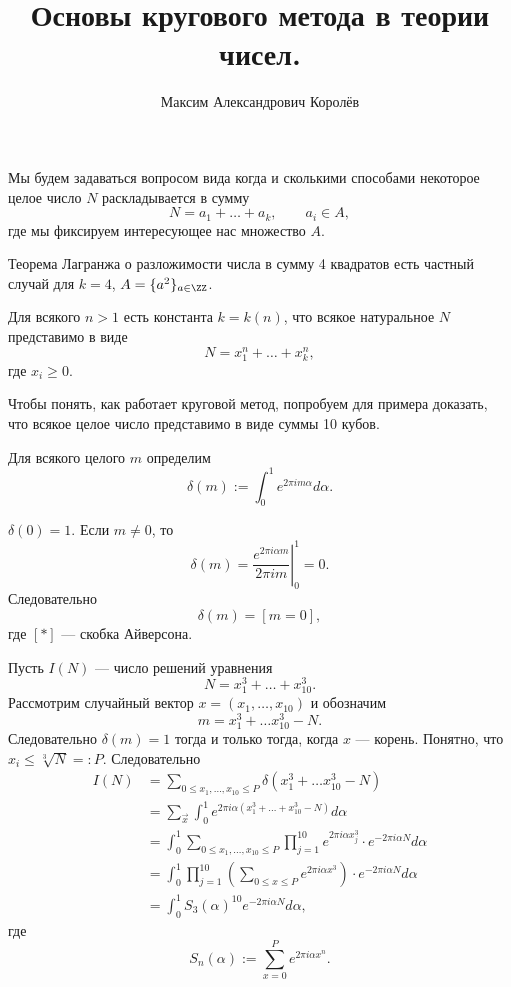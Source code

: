 \documentclass[12pt,a4paper]{article}
\title{Основы кругового метода в теории чисел.}
\author{Максим Александрович Королёв}
\begin{document}
    \maketitle

    Мы будем задаваться вопросом вида когда и сколькими способами некоторое целое число $N$ раскладывается в сумму
    \[N = a_1 + \dots + a_k, \qquad a_i \in A,\]
    где мы фиксируем интересующее нас множество $A$.

    \begin{example}
        Теорема Лагранжа о разложимости числа в сумму 4 квадратов есть частный случай для $k = 4$, $A = \{a^2\}_{a \in \ZZ}$.
    \end{example}

    \begin{statement}
        Для всякого $n > 1$ есть константа $k = k(n)$, что всякое натуральное $N$ представимо в виде
        \[N = x_1^n + \dots + x_k^n,\]
        где $x_i \geqslant 0$.
    \end{statement}

    Чтобы понять, как работает круговой метод, попробуем для примера доказать, что всякое целое число представимо в виде суммы 10 кубов.

    \begin{definition}
        Для всякого целого $m$ определим
        \[\delta(m) := \int_0^1 e^{2\pi i m \alpha} d\alpha.\]
    \end{definition}

    \begin{remark}
        $\delta(0) = 1$. Если $m \neq 0$, то
        \[\delta(m) = \left.\frac{e^{2\pi i \alpha m}}{2 \pi i m}\right|_0^1 = 0.\]
        Следовательно
        \[\delta(m) = [m = 0],\]
        где $[*]$ --- скобка Айверсона.
    \end{remark}

    Пусть $I(N)$ --- число решений уравнения
    \[N = x_1^3 + \dots + x_{10}^3.\]
    Рассмотрим случайный вектор $x = (x_1, \dots, x_{10})$ и обозначим
    \[m = x_1^3 + \dots x_{10}^3 - N.\]
    Следовательно $\delta(m) = 1$ тогда и только тогда, когда $x$ --- корень. Понятно, что $x_i \leqslant \sqrt[3]{N} =: P$. Следовательно
    \begin{align*}
        I(N)
        &= \sum_{0 \leqslant x_1, \dots, x_{10} \leqslant P} \delta(x_1^3 + \dots x_{10}^3 - N)\\
        &= \sum_{\vec{x}} \int_0^1 e^{2\pi i \alpha (x_1^3 + \dots + x_{10}^3 - N)} d\alpha\\
        &= \int_0^1 \sum_{0 \leqslant x_1, \dots, x_{10} \leqslant P} \prod_{j=1}^{10} e^{2\pi i \alpha x_j^3} \cdot e^{-2\pi i \alpha N} d\alpha\\
        &= \int_0^1 \prod_{j=1}^{10} \left(\sum_{0 \leqslant x \leqslant P} e^{2\pi i \alpha x^3}\right) \cdot e^{-2\pi i \alpha N} d\alpha\\
        &= \int_0^1 S_3(\alpha)^{10} e^{-2\pi i \alpha N} d\alpha,
    \end{align*}
    где
    \[S_n(\alpha) := \sum_{x=0}^P e^{2\pi i \alpha x^n}.\]
\end{document}
